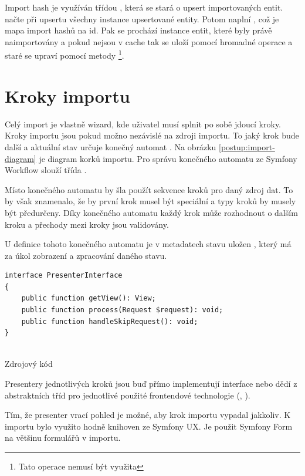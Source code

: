 Import hash je využíván třídou , která se stará o upsert importovaných entit.
 načte při upsertu všechny instance upsertované entity.
Potom naplní , což je mapa import hashů na id.
Pak se prochází instance entit, které byly právě naimportovány a pokud nejsou v cache tak se uloží pomocí hromadné operace a staré  se upraví pomocí metody \footnote{Tato operace nemusí být využita}.


\section{Kroky importu}

Celý import je vlastně wizard, kde uživatel musí splnit po sobě jdoucí kroky.
Kroky importu jsou pokud možno nezávislé na zdroji importu. 
To jaký krok bude další a aktuální stav určuje konečný automat .
Na obrázku \ref{postup:import-diagram} je diagram korků importu.
Pro správu konečného automatu ze Symfony Workflow slouží třída .

Místo konečného automatu by šla použít sekvence kroků pro daný zdroj dat.
To by však znamenalo, že by první krok musel být speciální a typy kroků by musely být předurčeny.
Díky konečného automatu každý krok může rozhodnout o dalším kroku a přechody mezi kroky jsou validovány.

U definice tohoto konečného automatu je v metadatech stavu uložen , který má za úkol zobrazení a zpracování daného stavu. 

\begin{code}
  \begin{verbatim}
interface PresenterInterface
{
    public function getView(): View;
    public function process(Request $request): void;
    public function handleSkipRequest(): void;
}
 
    \end{verbatim}
    \caption{Zdrojový kód }

\end{code}


Presentery jednotlivých kroků jsou buď přímo implementují interface nebo dědí z abstraktních tříd
pro jednotlivé použité frontendové technologie (, ).

Tím, že presenter vrací pohled je možné, aby krok importu vypadal jakkoliv.
K importu bylo využito hodně knihoven ze Symfony UX.
Je použit Symfony Form na většinu formulářů v importu.


